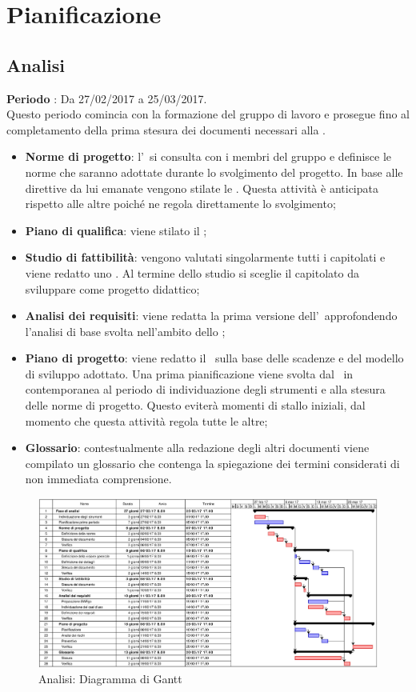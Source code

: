 \documentclass[../PianoDiProgetto.tex]{subfiles}
\begin{document}
	\section{Pianificazione}
	
		\subsection{Analisi}
		\textbf{Periodo} : Da 27/02/2017 a 25/03/2017. \\
		Questo periodo comincia con la formazione del gruppo di lavoro e prosegue fino al completamento della prima stesura dei documenti necessari alla \revisionedeirequisiti.
		\begin{itemize}
			\item \textbf{Norme di progetto}: l'\amministratore\ si consulta con i membri del gruppo e definisce le norme che saranno adottate durante lo svolgimento del progetto. In base alle direttive da lui emanate vengono stilate le \normediprogetto. Questa attività è anticipata rispetto alle altre poiché ne regola direttamente lo svolgimento;
			\item \textbf{Piano di qualifica}: viene stilato il  \pianodiqualifica ;
			\item \textbf{Studio di fattibilità}: vengono valutati singolarmente tutti i capitolati e viene redatto uno \studiodifattibilita. Al termine dello studio si sceglie il capitolato da sviluppare come progetto didattico;
			\item \textbf{Analisi dei requisiti}: viene redatta la prima versione dell'\analisideirequisiti\ approfondendo l'analisi di base svolta nell'ambito dello \studiodifattibilita ;
			\item \textbf{Piano di progetto}: viene redatto il \pianodiprogetto\ sulla base delle scadenze e del modello di sviluppo adottato. Una prima pianificazione viene svolta dal \responsabilediprogetto\ in contemporanea al periodo di individuazione degli strumenti e alla stesura delle norme di progetto. Questo eviterà momenti di stallo iniziali, dal momento che questa attività regola tutte le altre;
			\item \textbf{Glossario}: contestualmente alla redazione degli altri documenti viene compilato un glossario che contenga la spiegazione dei termini considerati di non immediata comprensione.
		\end{itemize}
		\begin{figure}[H]
			\centering
			\includegraphics[scale=0.55]{Figures/Gantt_Analisi.jpg}
			\caption{Analisi: Diagramma di Gantt}
		\end{figure}
			
\end{document}
